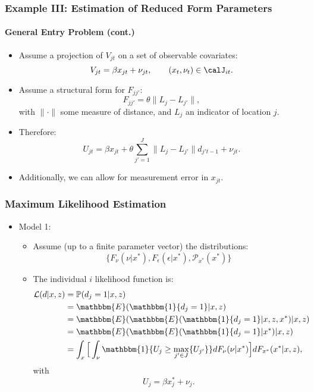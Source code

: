 \begin{frame}
\frametitle{Example III: Estimation of Reduced Form Parameters}
\framesubtitle{General Entry Problem (cont.)}

\begin{itemize}
	\item Assume a projection of $V_{jt}$ on a set of observable covariates:
	\begin{equation*}
	V_{jt}=\beta x_{jt} + \nu_{jt},\qquad(x_{t},\nu_{t})\in\calJ_{it}.
	\end{equation*}
	\item Assume a structural form for $F_{jj'}$:
	\begin{equation*}
	F_{jj'}=\theta\|L_{j}-L_{j'}\|,
	\end{equation*}
	with $\|\cdot\|$ some measure of distance, and $L_{j}$ an indicator of location $j$.
	\item Therefore:
	\begin{equation*}
	U_{jt}=\beta x_{jt}+\theta\sum_{j'=1}^{J}\|L_{j}-L_{j'}\|d_{j't-1}+\nu_{jt}.
	\end{equation*}
	\item Additionally, we can allow for measurement error in $x_{jt}$.
\end{itemize}
\end{frame}
\begin{frame}
\frametitle{Maximum Likelihood Estimation}

\begin{itemize}
	\item Model 1:
	\begin{itemize}
		\item Assume (up to a finite parameter vector) the distributions: 
		\begin{equation*}
		\{F_{\nu}(\nu|x^{*}), F_{\epsilon}(\epsilon|x^{*}), \mathcal{P}_{x^{*}}(x^{*})\}
		\end{equation*}
		\item The individual $i$ likelihood function is:
		\begin{equation*}
		\begin{split}
		\mathcal{L}(d|x,z)&=\mathbb{P}(d_{j}=1|x,z)\\
		&=\mathbbm{E}(\mathbbm{1}\{d_{j}=1\}|x,z)\\
		&=\mathbbm{E}(\mathbbm{E}(\mathbbm{1}\{d_{j}=1\}|x,z,x^{*})|x,z)\\
		&=\mathbbm{E}(\mathbbm{E}(\mathbbm{1}\{d_{j}=1\}|x^{*})|x,z)\\
		&=\int_{x}\Big[\int_{\nu}\mathbbm{1}\{U_{j}\geq\max_{j'\in J}\{U_{j'}\}\}dF_{\nu}(\nu|x^{*})\Big]dF_{x^{*}}(x^{*}|x,z),\\
		\end{split}
		\end{equation*}
		with
		\begin{equation*}
		U_{j}=\beta x^{*}_{j}+\nu_{j}.
		\end{equation*}
	\end{itemize}
\end{itemize}
\end{frame}

